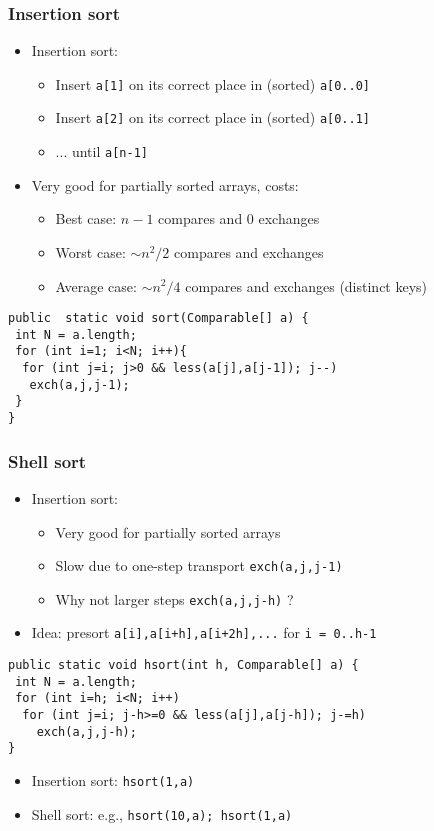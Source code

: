 \documentclass[handout]{beamer}
\begin{document}
\begin{frame}[fragile]
    \frametitle{Insertion sort}

\begin{itemize}[<+->]
\item Insertion sort: 
  \begin{itemize}
  \item Insert {\tt a[1]} on its correct place in (sorted) {\tt a[0..0]}
  \item Insert {\tt a[2]} on its correct place in (sorted) {\tt a[0..1]}
  \item ... until {\tt a[n-1]}
  \end{itemize}
\item Very good for partially sorted arrays, costs:
  \begin{itemize}
  \item Best case: $n{-}1$ compares and 0 exchanges 
  \item Worst case: $\sim n^2 / 2$ compares and exchanges
  \item Average case: $\sim n^2 / 4$ compares and exchanges (distinct keys)
  \end{itemize}
\end{itemize}   
\begin{verbatim}
public  static void sort(Comparable[] a) {
 int N = a.length;
 for (int i=1; i<N; i++){
  for (int j=i; j>0 && less(a[j],a[j-1]); j--)
   exch(a,j,j-1);
 }
}    
\end{verbatim}  
\end{frame}


\begin{frame}[fragile]
    \frametitle{Shell sort}

\begin{itemize}[<+->]
\item Insertion sort: 
  \begin{itemize}
  \item Very good for partially sorted arrays
  \item Slow due to one-step transport {\tt exch(a,j,j-1)}
  \item Why not larger steps {\tt exch(a,j,j-h)} ?
  \end{itemize}
\item Idea: presort {\tt a[i],a[i+h],a[i+2h],...} for {\tt i = 0..h-1}%
\end{itemize}   
\begin{verbatim}
public static void hsort(int h, Comparable[] a) {
 int N = a.length;
 for (int i=h; i<N; i++)
  for (int j=i; j-h>=0 && less(a[j],a[j-h]); j-=h)
    exch(a,j,j-h);  
}
\end{verbatim}
\begin{itemize}[<+->]
\item Insertion sort: {\tt hsort(1,a)}
\item Shell sort: e.g., {\tt hsort(10,a); hsort(1,a)}
\end{itemize}     
\end{frame}
\end{document}
